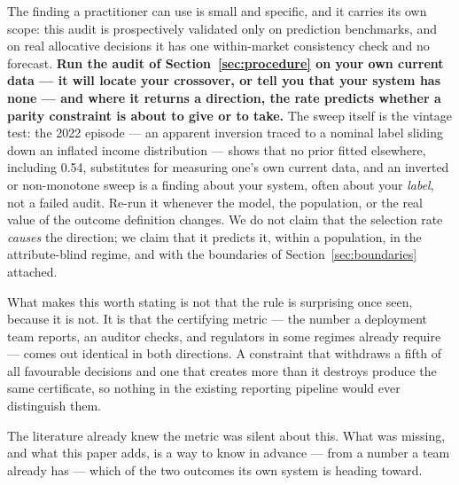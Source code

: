\documentclass[conference]{IEEEtran}
\begin{document}
The finding a practitioner can use is small and specific, and it carries its own scope: this audit is prospectively validated only on prediction benchmarks, and on real allocative decisions it has one within-market consistency check and no forecast. \textbf{Run the audit of Section~\ref{sec:procedure} on your own current data --- it will locate your crossover, or
tell you that your system has none --- and where it returns a direction, the rate predicts
whether a parity constraint is about to give or to take.} The sweep itself is the vintage
test: the 2022 episode --- an apparent inversion traced to a nominal label sliding down an
inflated income distribution --- shows that no prior fitted elsewhere, including 0.54,
substitutes for measuring one's own current data, and an inverted or non-monotone sweep is
a finding about your system, often about your \emph{label}, not a failed audit. Re-run it
whenever the model, the population, or the real value of the outcome definition changes. We do not claim that the selection rate \emph{causes} the direction; we claim
that it predicts it, within a population, in the attribute-blind regime, and with the
boundaries of Section~\ref{sec:boundaries} attached.

What makes this worth stating is not that the rule is surprising once seen, because it is
not. It is that the certifying metric --- the number a deployment team reports, an auditor
checks, and regulators in some regimes already require --- comes out identical in both directions. A
constraint that withdraws a fifth of all favourable decisions and one that creates more than
it destroys produce the same certificate, so nothing in the existing reporting pipeline
would ever distinguish them.

The literature already knew the metric was silent about this. What was missing, and what
this paper adds, is a way to know in advance --- from a number a team already has --- which
of the two outcomes its own system is heading toward.
\end{document}
